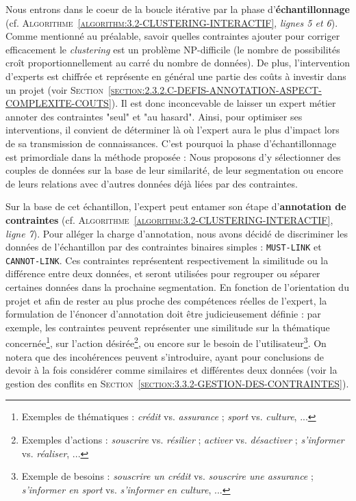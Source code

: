 		Nous entrons dans le coeur de la boucle itérative par la phase d'\textbf{échantillonnage} (cf. \textsc{Algorithme~\ref{algorithm:3.2-CLUSTERING-INTERACTIF}}, \textit{lignes 5 et 6}).
		Comme mentionné au préalable, savoir quelles contraintes ajouter pour corriger efficacement le \textit{clustering} est un problème NP-difficile (le nombre de possibilités croît proportionnellement au carré du nombre de données).
		De plus, l'intervention d'experts est chiffrée et représente en général une partie des coûts à investir dans un projet (voir \textsc{Section~\ref{section:2.3.2.C-DEFIS-ANNOTATION-ASPECT-COMPLEXITE-COUTS}}).
		Il est donc inconcevable de laisser un expert métier annoter des contraintes "seul" et "au hasard".
		Ainsi, pour optimiser ses interventions, il convient de déterminer là où l'expert aura le plus d'impact lors de sa transmission de connaissances.
		C'est pourquoi la phase d'échantillonnage est primordiale dans la méthode proposée : Nous proposons d'y sélectionner des couples de données sur la base de leur similarité, de leur segmentation ou encore de leurs relations avec d'autres données déjà liées par des contraintes.
		
		Sur la base de cet échantillon, l'expert peut entamer son étape d'\textbf{annotation de contraintes} (cf. \textsc{Algorithme~\ref{algorithm:3.2-CLUSTERING-INTERACTIF}}, \textit{ligne 7}).
		Pour alléger la charge d'annotation, nous avons décidé de discriminer les données de l'échantillon par des contraintes binaires simples : \texttt{MUST-LINK} et \texttt{CANNOT-LINK}. Ces contraintes représentent respectivement la similitude ou la différence entre deux données, et seront utilisées pour regrouper ou séparer certaines données dans la prochaine segmentation.
		En fonction de l'orientation du projet et afin de rester au plus proche des compétences réelles de l'expert, la formulation de l'énoncer d'annotation doit être judicieusement définie : par exemple, les contraintes peuvent représenter une similitude
		sur la thématique concernée\footnote{
			Exemples de thématiques : \textit{crédit} vs. \textit{assurance} ; \textit{sport} vs. \textit{culture}, ...
		}, sur l'action désirée\footnote{
			Exemples d'actions : \textit{souscrire} vs. \textit{résilier} ; \textit{activer} vs. \textit{désactiver} ; \textit{s'informer} vs. \textit{réaliser}, ...
		}, ou encore sur le besoin de l'utilisateur\footnote{
			Exemple de besoins : \textit{souscrire un crédit} vs. \textit{souscrire une assurance} ; \textit{s'informer en sport} vs. \textit{s'informer en culture}, ...
		}.
		On notera que des incohérences peuvent s'introduire, ayant pour conclusions de devoir à la fois considérer comme similaires et différentes deux données (voir la gestion des conflits en \textsc{Section~\ref{section:3.3.2-GESTION-DES-CONTRAINTES}}).
		
